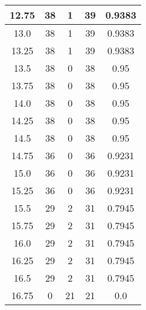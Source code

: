 \documentclass[letterpaper, 12pt]{article}
\begin{document}
\begin{longtable}{|c|c|c|c|c|}
\hline
12.75 & 38 & 1 & 39 & 0.9383 \\
\hline
13.0 & 38 & 1 & 39 & 0.9383 \\
\hline
13.25 & 38 & 1 & 39 & 0.9383 \\
\hline
13.5 & 38 & 0 & 38 & 0.95 \\
\hline
13.75 & 38 & 0 & 38 & 0.95 \\
\hline
14.0 & 38 & 0 & 38 & 0.95 \\
\hline
14.25 & 38 & 0 & 38 & 0.95 \\
\hline
14.5 & 38 & 0 & 38 & 0.95 \\
\hline
14.75 & 36 & 0 & 36 & 0.9231 \\
\hline
15.0 & 36 & 0 & 36 & 0.9231 \\
\hline
15.25 & 36 & 0 & 36 & 0.9231 \\
\hline
15.5 & 29 & 2 & 31 & 0.7945 \\
\hline
15.75 & 29 & 2 & 31 & 0.7945 \\
\hline
16.0 & 29 & 2 & 31 & 0.7945 \\
\hline
16.25 & 29 & 2 & 31 & 0.7945 \\
\hline
16.5 & 29 & 2 & 31 & 0.7945 \\
\hline
16.75 & 0 & 21 & 21 & 0.0 \\
\hline
\end{longtable}
\end{document}
